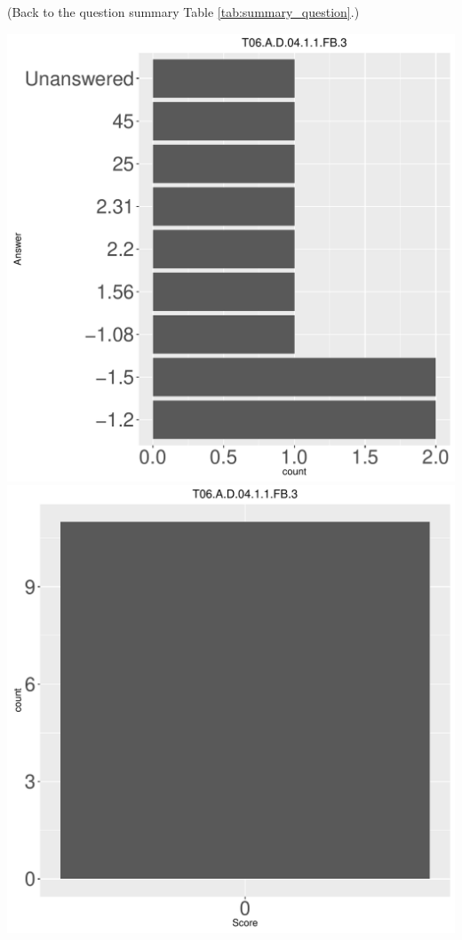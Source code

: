 \documentclass[12pt,english,nohyper]{tufte-handout}\usepackage[]{graphicx}\usepackage[]{color}
\begin{document}
 (Back to the question summary Table \ref{tab:summary_question}.)

\begin{center} \includegraphics[width=.45\linewidth]{Topic06_AB_15_answer} \includegraphics[width=.45\linewidth]{Topic06_AB_15_score} \end{center} 
\end{document}
